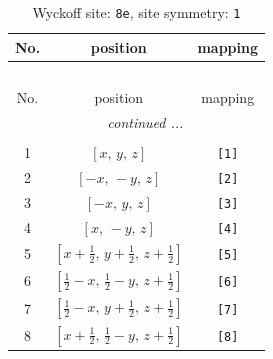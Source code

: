 \documentclass[fleqn,8pt]{jsarticle}
\begin{document}
\renewcommand{\arraystretch}{1.2}
\begin{longtable}{ccc}
\caption{Wyckoff site: {\tt 8e}, site symmetry: {\tt 1}}
 \\
 \hline \hline
No. & position & mapping \\ \hline \endfirsthead

\multicolumn{2}{l}{\tablename\ \thetable{}} \\
 \hline \hline
No. & position & mapping \\ \hline \endhead

 \hline \hline
\multicolumn{2}{r}{\footnotesize\it continued ...} \\ \endfoot

 \hline \hline
\multicolumn{2}{r}{} \\ \endlastfoot

1 & $\left[ x,\, y,\, z \right]$ & {\tt [1]} \\ \hline
2 & $\left[ - x,\, - y,\, z \right]$ & {\tt [2]} \\ \hline
3 & $\left[ - x,\, y,\, z \right]$ & {\tt [3]} \\ \hline
4 & $\left[ x,\, - y,\, z \right]$ & {\tt [4]} \\ \hline
5 & $\left[ x + \frac{1}{2},\, y + \frac{1}{2},\, z + \frac{1}{2} \right]$ & {\tt [5]} \\ \hline
6 & $\left[ \frac{1}{2} - x,\, \frac{1}{2} - y,\, z + \frac{1}{2} \right]$ & {\tt [6]} \\ \hline
7 & $\left[ \frac{1}{2} - x,\, y + \frac{1}{2},\, z + \frac{1}{2} \right]$ & {\tt [7]} \\ \hline
8 & $\left[ x + \frac{1}{2},\, \frac{1}{2} - y,\, z + \frac{1}{2} \right]$ & {\tt [8]} \\
\end{longtable}
\end{document}
